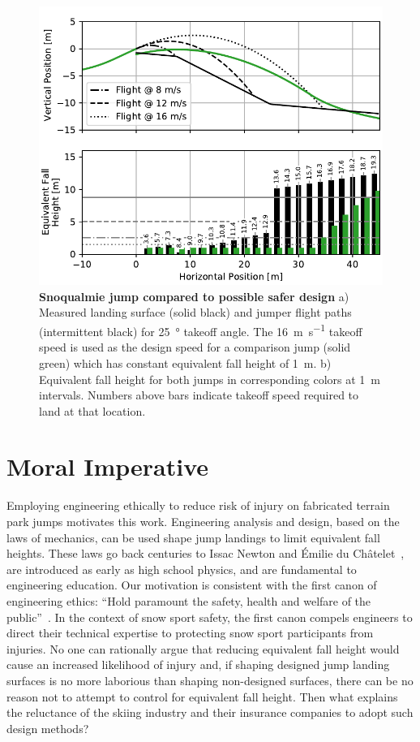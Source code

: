 \documentclass{article}
\begin{document}
\begin{figure}
  \centering
  \includegraphics[width=5.25in]{figures/salvini-v-snoqualmie.pdf}
  \caption{\textbf{Snoqualmie jump compared to possible safer design}
  a) Measured landing surface (solid black) and jumper flight paths (intermittent
  black) for 25~\si{\degree} takeoff angle. The
  16~\si{\meter\per\second} takeoff speed is used as the design speed for a comparison
  jump (solid green) which has constant equivalent fall height of 1~\si{\meter}.
  b) Equivalent fall height for both jumps
  in corresponding colors at 1~\si{\meter} intervals. Numbers above
  bars indicate takeoff speed required
  to land at that location. 
  }
  \label{fig:salvini-v-snoqualmie}
\end{figure}

\section{Moral Imperative}
%
Employing engineering ethically to reduce risk of injury on fabricated
terrain park jumps motivates this work. Engineering analysis and design, based
on the laws of mechanics, can be used shape jump landings to limit
equivalent fall heights. These laws go back centuries to Issac Newton and
Émilie du Châtelet~\cite{Zinsser2007}, are introduced as early as high school
physics, and are fundamental to engineering education. Our motivation is consistent 
with the first canon of engineering ethics: ``Hold paramount the safety, health
and welfare of the public''~\cite{NSPE2019}. In the context of snow sport
safety, the first canon compels engineers to direct their technical expertise
to protecting snow sport participants from injuries. No one can rationally
argue that reducing equivalent fall height would cause an increased likelihood
of injury and, if shaping designed jump landing surfaces is no more laborious
than shaping non-designed surfaces, there can be no reason not to attempt to
control for equivalent fall height. Then what explains the reluctance of the
skiing industry and their insurance companies to adopt such design methods?
\end{document}
